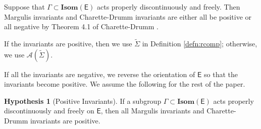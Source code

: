\documentclass{amsart}
\numberwithin{equation}{section}
\newcommand\Isom{{\mathbf{Isom}}}
\newcommand\Ss{{\mathbb{S}}}
\newcommand\Lspace{\mathsf E}
\theoremstyle{definition}
\newtheorem{hypothesis}{Hypothesis}[section]
\theoremstyle{remark}
\newcommand{\rome}{\mathrm e}
\begin{document}
 Suppose that
 $\Gamma \subset \Isom(\Lspace)$ acts properly discontinuously
    and freely. Then Margulis invariants and Charette-Drumm invariants 
    are either all be positive or all negative by Theorem 4.1 of Charette-Drumm \cite{CD05}.

    If the invariants are positive, then we use $\tilde \Sigma$ 
    in Definition \ref{defn:rcomp}; otherwise, we use 
    $\mathcal{A}(\tilde \Sigma)$.

    If all the invariants are negative, we reverse the orientation of 
$\Lspace$ so that the invariants become positive. 
    We assume the following for the rest of the paper. 
\begin{hypothesis}[Positive Invariants]\label{hyp:positive}
   If a subgroup  $\Gamma \subset \Isom(\Lspace)$ acts properly discontinuously and freely on
   $\Lspace$, then all Margulis invariants and Charette-Drumm invariants are positive. 
\end{hypothesis}






\end{document}
